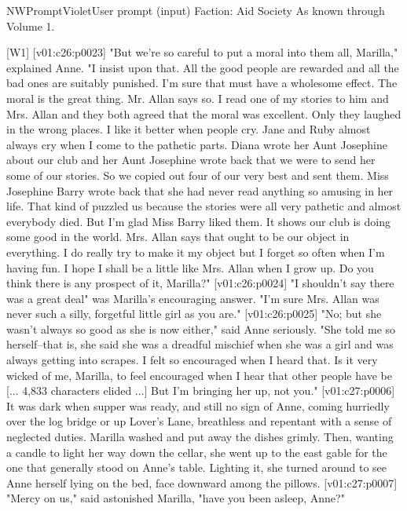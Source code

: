 \begin{nwprompt}{NWPromptViolet}{User prompt (input)}
Faction: Aid Society
As known through Volume 1.

[W1] [v01:c26:p0023] "But we're so careful to put a moral into them all, Marilla," explained Anne. "I insist upon that. All the good people are rewarded and all the bad ones are suitably punished. I'm sure that must have a wholesome effect. The moral is the great thing. Mr. Allan says so. I read one of my stories to him and Mrs. Allan and they both agreed that the moral was excellent. Only they laughed in the wrong places. I like it better when people cry. Jane and Ruby almost always cry when I come to the pathetic parts. Diana wrote her Aunt Josephine about our club and her Aunt Josephine wrote back that we were to send her some of our stories. So we copied out four of our very best and sent them. Miss Josephine Barry wrote back that she had never read anything so amusing in her life. That kind of puzzled us because the stories were all very pathetic and almost everybody died. But I'm glad Miss Barry liked them. It shows our club is doing some good in the world. Mrs. Allan says that ought to be our object in everything. I do really try to make it my object but I forget so often when I'm having fun. I hope I shall be a little like Mrs. Allan when I grow up. Do you think there is any prospect of it, Marilla?"
[v01:c26:p0024] "I shouldn't say there was a great deal" was Marilla's encouraging answer. "I'm sure Mrs. Allan was never such a silly, forgetful little girl as you are."
[v01:c26:p0025] "No; but she wasn't always so good as she is now either," said Anne seriously. "She told me so herself--that is, she said she was a dreadful mischief when she was a girl and was always getting into scrapes. I felt so encouraged when I heard that. Is it very wicked of me, Marilla, to feel encouraged when I hear that other people have be
[... 4,833 characters elided ...]
But I'm bringing her up, not you."
[v01:c27:p0006] It was dark when supper was ready, and still no sign of Anne, coming hurriedly over the log bridge or up Lover's Lane, breathless and repentant with a sense of neglected duties. Marilla washed and put away the dishes grimly. Then, wanting a candle to light her way down the cellar, she went up to the east gable for the one that generally stood on Anne's table. Lighting it, she turned around to see Anne herself lying on the bed, face downward among the pillows.
[v01:c27:p0007] "Mercy on us," said astonished Marilla, "have you been asleep, Anne?"
\end{nwprompt}

